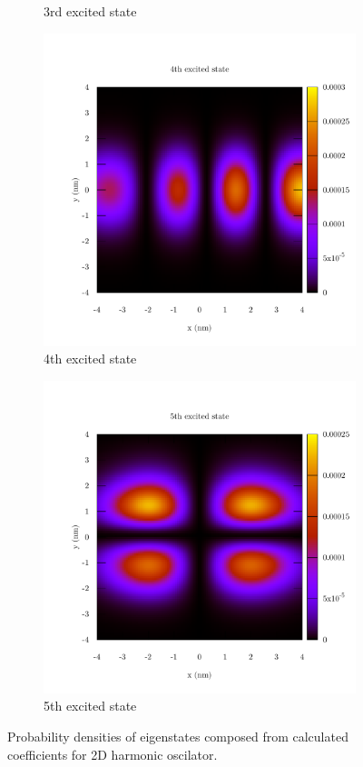 \documentclass[12pt,a4]{article}
\begin{document}
\begin{figure}[H]
\begin{subfigure}{.33\textwidth}
	\caption{3rd excited state}
	\end{subfigure}
	\begin{subfigure}{.33\textwidth}
	\includegraphics[width=\textwidth]{../plots/state_4.pdf}
	\caption{4th excited state}
	\end{subfigure}
	\begin{subfigure}{.33\textwidth}
	\includegraphics[width=\textwidth]{../plots/state_5.pdf}
	\caption{5th excited state}
	\end{subfigure}
	\caption{Probability densities of eigenstates composed from calculated coefficients for 2D harmonic oscilator.}
\end{figure}
\end{document}
